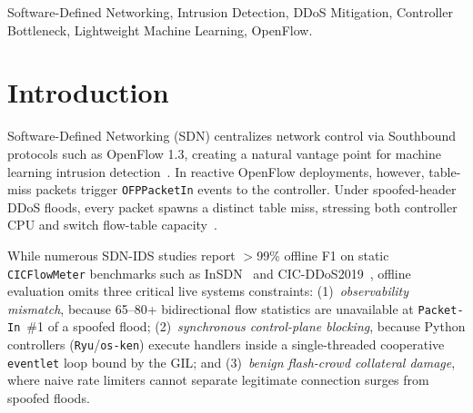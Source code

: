 \documentclass[conference]{IEEEtran}
\begin{document}
\begin{IEEEkeywords}
Software-Defined Networking, Intrusion Detection, DDoS Mitigation, Controller Bottleneck, Lightweight Machine Learning, OpenFlow.
\end{IEEEkeywords}

\section{Introduction}
Software-Defined Networking (SDN) centralizes network control via Southbound protocols such as OpenFlow 1.3, creating a natural vantage point for machine learning intrusion detection~\cite{janabi2024survey}. In reactive OpenFlow deployments, however, table-miss packets trigger \texttt{OFPPacketIn} events to the controller. Under spoofed-header DDoS floods, every packet spawns a distinct table miss, stressing both controller CPU and switch flow-table capacity~\cite{shin2013avantguard,wang2015floodguard}.

While numerous SDN-IDS studies report $>$99\% offline F1 on static \texttt{CICFlowMeter} benchmarks such as InSDN~\cite{elsayed2020insdn} and CIC-DDoS2019~\cite{sharafaldin2019cicddos}, offline evaluation omits three critical live systems constraints: (1)~\emph{observability mismatch}, because 65--80+ bidirectional flow statistics are unavailable at \texttt{Packet-In}~\#1 of a spoofed flood; (2)~\emph{synchronous control-plane blocking}, because Python controllers (\texttt{Ryu}/\texttt{os-ken}) execute handlers inside a single-threaded cooperative \texttt{eventlet} loop bound by the GIL; and (3)~\emph{benign flash-crowd collateral damage}, where naive rate limiters cannot separate legitimate connection surges from spoofed floods.
\end{document}
